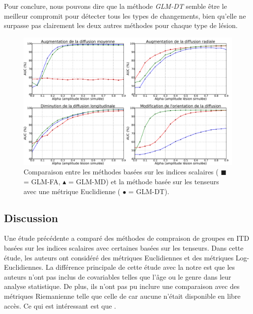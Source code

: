 Pour conclure, nous pouvons dire que la méthode \textit{GLM-DT} semble être le meilleur compromit pour détecter tous les types de changements,
bien qu'elle ne surpasse pas clairement les deux autres méthodes pour chaque type de lésion.

\begin{figure}[t]
    \centering
    \includegraphics[width=1\textwidth]{Images/AUC_methods_gaussian8_fr.pdf}
    \caption{\label{fig:res_scalar} Comparaison entre les méthodes basées sur les indices scalaires ({\color{red} $\blacksquare$ = GLM-FA}, {\color{blue} $\blacktriangle$ = GLM-MD}) 
    et la méthode basée sur les tenseurs avec une métrique Euclidienne ({\color{green} $\bullet$ = GLM-DT}).}
\end{figure}


\subsection{Discussion}
Une étude \cite{Whitcher2007} précédente a comparé des méthodes de compraison de groupes en ITD basées sur les indices scalaires avec certaines basées sur les tenseurs.
Dans cette étude, les auteurs ont considéré des métriques Euclidiennes et des métriques Log-Euclidiennes.
La différence principale de cette étude avec la notre est que les auteurs \cite{Whitcher2007} n'ont pas inclus de covariables telles que l'âge ou le genre dans leur analyse statistique.
De plus, ils n'ont pas pu inclure une comparaison avec des métriques Riemanienne telle que celle de \cite{Kim2014} car aucune n'était disponible en libre accès.
Ce qui est intéressant est que .

